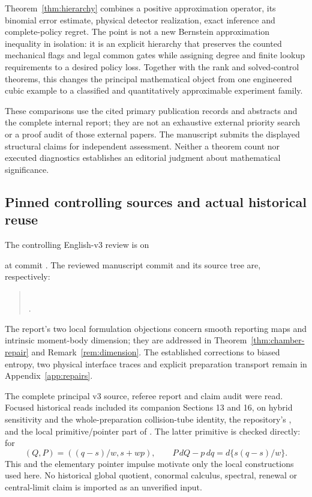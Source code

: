 Theorem~\ref{thm:hierarchy} combines a positive approximation operator, its binomial error estimate, physical detector realization, exact inference and complete-policy regret. The point is not a new Bernstein approximation inequality in isolation: it is an explicit hierarchy that preserves the counted mechanical flags and legal common gates while assigning degree and finite lookup requirements to a desired policy loss. Together with the rank and solved-control theorems, this changes the principal mathematical object from one engineered cubic example to a classified and quantitatively approximable experiment family.

These comparisons use the cited primary publication records and abstracts and the complete internal report; they are not an exhaustive external priority search or a proof audit of those external papers. The manuscript submits the displayed structural claims for independent assessment. Neither a theorem count nor executed diagnostics establishes an editorial judgment about mathematical significance.

\subsection{Pinned controlling sources and actual historical reuse}
The controlling English-v3 review is on
\begin{quote}\small{}\end{quote}
at commit . The reviewed manuscript commit and its source tree are, respectively:
\begin{quote}\small
{}\\
.
\end{quote} The report's two local formulation objections concern smooth reporting maps and intrinsic moment-body dimension; they are addressed in Theorem~\ref{thm:chamber-repair} and Remark~\ref{rem:dimension}. The established corrections to biased entropy, two physical interface traces and explicit preparation transport remain in Appendix~\ref{app:repairs}.

The complete principal v3 source, referee report and claim audit were read. Focused historical reads included its companion Sections 13 and 16, on hybrid sensitivity and the whole-preparation collision-tube identity, the repository's , and the local primitive/pointer part of . The latter primitive is checked directly: for
\[
 (Q,P)=((q-s)/w,s+wp),\qquad P\,dQ-p\,dq=d\{s(q-s)/w\}.
\]
This and the elementary pointer impulse motivate only the local constructions used here. No historical global quotient, conormal calculus, spectral, renewal or central-limit claim is imported as an unverified input.

